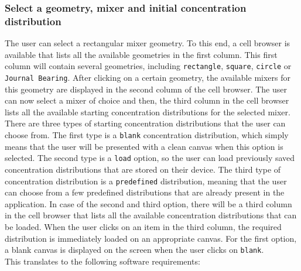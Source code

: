 \subsubsection{Select a geometry, mixer and initial concentration distribution}
The user can select a rectangular mixer geometry. To this end, a cell browser is available that lists all the available geometries in the first column. This first column will contain several geometries, including \texttt{rectangle}, \texttt{square}, \texttt{circle} or \texttt{Journal Bearing}. After clicking on a certain geometry, the available mixers for this geometry are displayed in the second column of the cell browser. The user can now select a mixer of choice and then, the third column in the cell browser lists all the available starting concentration distributions for the selected mixer. There are three types of starting concentration distributions that the user can choose from. The first type is a \texttt{blank} concentration distribution, which simply means that the user will be presented with a clean canvas when this option is selected. The second type is a \texttt{load} option, so the user can load previously saved concentration distributions that are stored on their device. The third type of 
concentration distribution is a \texttt{predefined} distribution, meaning that the user can choose from a few predefined distributions that are already present in the application. In case of the second and third option, there will be a third column in the cell browser that lists all the available concentration distributions that can be loaded. When the user clicks on an item in the third column, the required distribution is immediately loaded on an appropriate canvas. For the first option, a blank canvas is displayed on the screen when the user clicks on \texttt{blank}. \\
This translates to the following software requirements:
